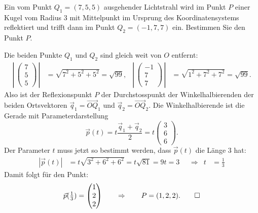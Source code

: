 Ein vom Punkt $Q_1=(7,5,5)$ ausgehender Lichtstrahl wird im Punkt $P$
einer Kugel vom Radius $3$ mit Mittelpunkt im Ursprung des Koordinatensystems
reflektiert und trifft dann im Punkt $Q_2=(-1,7,7)$ ein.
Bestimmen Sie den Punkt $P$.


\begin{loesung}
Die beiden Punkte $Q_1$ und $Q_2$ sind gleich weit von $O$ entfernt:
\begin{align*}
\left|\,\begin{pmatrix} 7\\5\\5 \end{pmatrix} \,\right|
&=\sqrt{7^2+5^2+5^2}=\sqrt{99},
&
\left|\,\begin{pmatrix}-1\\7\\7 \end{pmatrix} \,\right|
&=\sqrt{1^2+7^2+7^2}=\sqrt{99}.
\end{align*}
Also ist der Reflexionspunkt $P$ der Durchstosspunkt der Winkelhalbierenden
der beiden Ortsvektoren $\vec q_1=\overrightarrow{OQ}_1$ und
$\vec q_2=\overrightarrow{OQ}_2$. Die Winkelhalbierende ist
die Gerade mit Parameterdarstellung
\[
\vec p(t)=t\frac{\vec q_1+\vec q_2}2=t\begin{pmatrix} 3\\6\\6 \end{pmatrix}.
\]
Der Parameter $t$ muss jetzt so bestimmt werden, dass $\vec p(t)$ die Länge
$3$ hat:
\begin{align*}
|\vec p(t)|&=t\sqrt{3^2+6^2+6^2}=t\sqrt{81}=9t=3
&&\Rightarrow&
t&=\frac13
\end{align*}
Damit folgt für den Punkt:
\[
\vec p({\textstyle\frac13})=\begin{pmatrix}1\\2\\2\end{pmatrix}
\qquad\Rightarrow\qquad
P=(1,2,2).
\qedhere
\]
\end{loesung}
